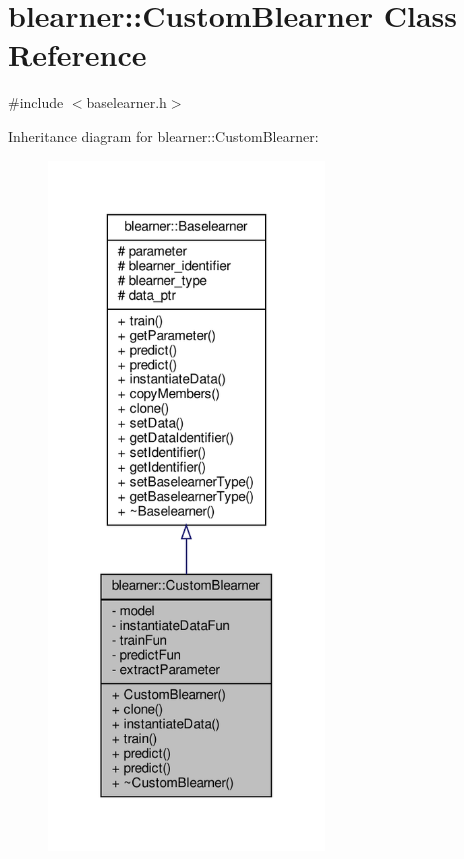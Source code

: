 \hypertarget{classblearner_1_1_custom_blearner}{}\section{blearner\+:\+:Custom\+Blearner Class Reference}
\label{classblearner_1_1_custom_blearner}


{\ttfamily \#include $<$baselearner.\+h$>$}



Inheritance diagram for blearner\+:\+:Custom\+Blearner\+:
\nopagebreak
\begin{figure}[H]
\begin{center}
\leavevmode
\includegraphics[width=208pt]{classblearner_1_1_custom_blearner__inherit__graph}
\end{center}
\end{figure}


